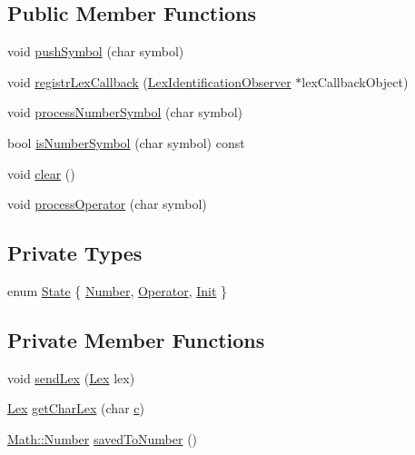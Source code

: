 \subsection*{Public Member Functions}
\begin{DoxyCompactItemize}
\item 
void \hyperlink{classteam22_1_1_calc_1_1_lexical_analyzer_af56c536f78c680bd635ac1173e65b492}{push\+Symbol} (char symbol)
\item 
void \hyperlink{classteam22_1_1_calc_1_1_lexical_analyzer_ae7fb3f4ce9e6020215352c0c9e2b8245}{registr\+Lex\+Callback} (\hyperlink{classteam22_1_1_calc_1_1_lex_identification_observer}{Lex\+Identification\+Observer} $\ast$lex\+Callback\+Object)
\item 
void \hyperlink{classteam22_1_1_calc_1_1_lexical_analyzer_a18ba04d046da0b11eec66fb2689ddfef}{process\+Number\+Symbol} (char symbol)
\item 
bool \hyperlink{classteam22_1_1_calc_1_1_lexical_analyzer_a922bf14131d064fce52bf126e8d29839}{is\+Number\+Symbol} (char symbol) const
\item 
void \hyperlink{classteam22_1_1_calc_1_1_lexical_analyzer_adf38772b29f998549aa532e8f380b4b2}{clear} ()
\item 
void \hyperlink{classteam22_1_1_calc_1_1_lexical_analyzer_ab84b6b8f52056452cd52b8abdb9a3faa}{process\+Operator} (char symbol)
\end{DoxyCompactItemize}
\subsection*{Private Types}
\begin{DoxyCompactItemize}
\item 
enum \hyperlink{classteam22_1_1_calc_1_1_lexical_analyzer_aef11ba66454715a80d5964c07f6d8cc3}{State} \{ \hyperlink{classteam22_1_1_calc_1_1_lexical_analyzer_aef11ba66454715a80d5964c07f6d8cc3a862f179df5de529676972b3b95c52f86}{Number}, 
\hyperlink{classteam22_1_1_calc_1_1_lexical_analyzer_aef11ba66454715a80d5964c07f6d8cc3ae2510b92e28892c94126aa4273470f78}{Operator}, 
\hyperlink{classteam22_1_1_calc_1_1_lexical_analyzer_aef11ba66454715a80d5964c07f6d8cc3a11976214c837f23fd71b2af8b0de3d5b}{Init}
 \}
\end{DoxyCompactItemize}
\subsection*{Private Member Functions}
\begin{DoxyCompactItemize}
\item 
void \hyperlink{classteam22_1_1_calc_1_1_lexical_analyzer_afd6bb48e5de7f8490addc9b326bfeb49}{send\+Lex} (\hyperlink{classteam22_1_1_calc_1_1_lex}{Lex} lex)
\item 
\hyperlink{classteam22_1_1_calc_1_1_lex}{Lex} \hyperlink{classteam22_1_1_calc_1_1_lexical_analyzer_a451aa3e3ed6f150d5b24fae76cc93cb4}{get\+Char\+Lex} (char \hyperlink{_number_8cpp_a3a6c194a55c239306d07bbf83f5972e9}{c})
\item 
\hyperlink{classteam22_1_1_math_1_1_number}{Math\+::\+Number} \hyperlink{classteam22_1_1_calc_1_1_lexical_analyzer_a689b52c49cd7c9e87dd468987472af83}{saved\+To\+Number} ()
\end{DoxyCompactItemize}
